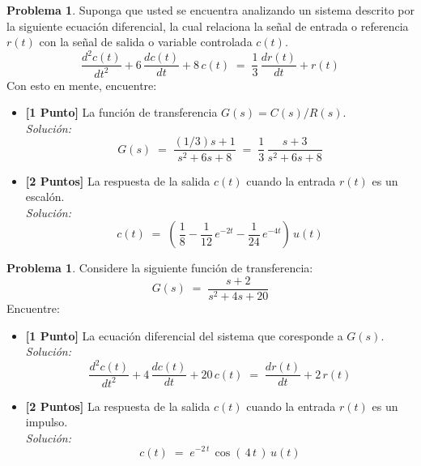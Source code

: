 \documentclass[ a4paper, twoside, 11pt]{article}
\theoremstyle{definition}
\newtheorem{problem}[definition]{Problema}
\begin{document}
\begin{problem}
Suponga que usted se encuentra analizando un sistema descrito por la \linebreak siguiente ecuaci\'on diferencial, la cual relaciona la se\~nal de entrada o referencia $r(t)$ con la se\~nal de salida o variable controlada $c(t)$. 
\[
\frac{d^2c(t)}{dt^2} + 6 \, \frac{dc(t)}{dt} + 8 \, c(t) 
\; = \; \frac{1}{3} \, \frac{dr(t)}{dt} + r(t)
\]
Con esto en mente, encuentre: 
\begin{itemize}
\item \textbf{[1 Punto]} La funci\'on de transferencia $G(s) = C(s)/R(s)$. \\ \emph{Soluci\'on:}
\[
G(s)
\; = \; \frac{(1/3)s + 1}{s^2 + 6s + 8}
\; = \; \frac{1}{3} \, \frac{s+3}{s^2 + 6s + 8}
\]
\item \textbf{[2 Puntos]} La respuesta de la salida $c(t)$ cuando la entrada $r(t)$ es un escal\'on. \\ \emph{Soluci\'on:}
\[
c(t) \; = \; 
\left( \,
\frac{1}{8}
- \frac{1}{12} \, e^{-2t}
- \frac{1}{24} \, e^{-4t}
\right) \, u(t)
\]
\end{itemize}

\end{problem}
\vspace{\baselineskip}

\begin{problem}
Considere la siguiente funci\'on de transferencia: 
\[
G(s) \; = \; \frac{s + 2}{s^2 + 4s + 20}
\]
Encuentre: 
\begin{itemize}
\item \textbf{[1 Punto]} La ecuaci\'on diferencial del sistema que coresponde a $G(s)$. \\ \emph{Soluci\'on:} 
\[
\frac{d^2 c(t)}{dt^2} + 4 \, \frac{dc(t)}{dt} + 20 \, c(t) 
\; = \; 
\frac{dr(t)}{dt} + 2 \, r(t)
\]
\item \textbf{[2 Puntos]} La respuesta de la salida $c(t)$ cuando la entrada $r(t)$ es un impulso. \\ \emph{Soluci\'on:} 
\[
c(t) \; = \; e^{ -2 \, t } \, \cos( \, 4 \, t \, ) \, u(t)
\]
\end{itemize}

\end{problem}
\vspace{\baselineskip}
\end{document}

